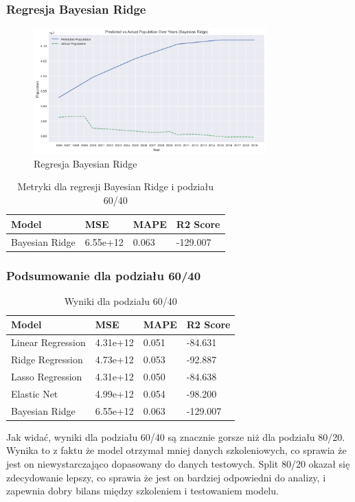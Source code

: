 \documentclass[11pt]{article}
\begin{document}
\subsubsection{Regresja Bayesian Ridge}
\begin{figure}[H]
        \centering
        \includegraphics[width=0.8\textwidth]{images/bayesian_ridge996.png}
        \caption{Regresja Bayesian Ridge}
\end{figure}
\begin{table}[H]
        \centering
        \begin{tabular}{|l|l|l|l|}
        \hline
        Model & MSE & MAPE & R2 Score \\ \hline
        Bayesian Ridge & 6.55e+12 & 0.063 & -129.007 \\ \hline
        \end{tabular}
        \caption{Metryki dla regresji Bayesian Ridge i podziału 60/40}
\end{table}
\subsubsection{Podsumowanie dla podziału 60/40}
\begin{table}[H]
        \centering
        \begin{tabular}{|l|l|l|l|}
        \hline
        Model & MSE & MAPE & R2 Score \\ \hline
        Linear Regression & 4.31e+12 & 0.051 & -84.631 \\ \hline
        Ridge Regression & 4.73e+12 & 0.053 & -92.887 \\ \hline
        Lasso Regression & 4.31e+12 & 0.050 & -84.638 \\ \hline
        Elastic Net & 4.99e+12 & 0.054 & -98.200 \\ \hline
        Bayesian Ridge & 6.55e+12 & 0.063 & -129.007 \\ \hline
        \end{tabular}
        \caption{Wyniki dla podziału 60/40}
        \end{table}
Jak widać, wyniki dla podziału 60/40 są znacznie gorsze niż dla podziału 80/20. Wynika to z faktu że model otrzymał mniej danych szkoleniowych, co sprawia że jest on niewystarczająco dopasowany do danych testowych.
Split 80/20 okazał się zdecydowanie lepszy, co sprawia że jest on bardziej odpowiedni do analizy, i zapewnia dobry bilans między szkoleniem i testowaniem modelu.
\end{document}
